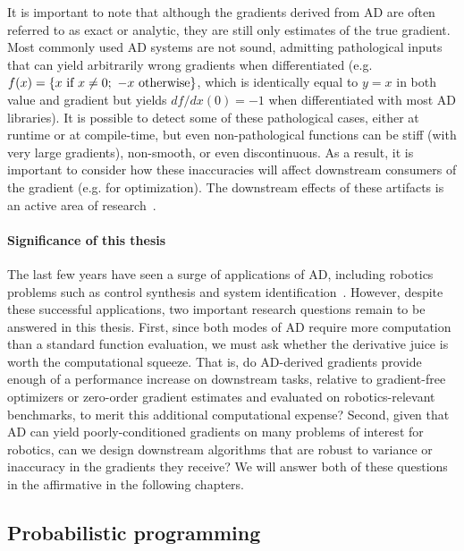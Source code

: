 It is important to note that although the gradients derived from AD are often referred to as exact or analytic, they are still only estimates of the true gradient. Most commonly used AD systems are not sound, admitting pathological inputs that can yield arbitrarily wrong gradients when differentiated (e.g. $f(x) = \left\{x \text{ if } x \neq 0;\ -x \text{ otherwise}\right\}$, which is identically equal to $y = x$ in both value and gradient but yields $df/dx(0) = -1$ when differentiated with most AD libraries). It is possible to detect some of these pathological cases, either at runtime or at compile-time, but even non-pathological functions can be stiff (with very large gradients), non-smooth, or even discontinuous. As a result, it is important to consider how these inaccuracies will affect downstream consumers of the gradient (e.g. for optimization). The downstream effects of these artifacts is an active area of research~\cite{suh2021_bundled_gradients,suhDifferentiableSimulatorsGive2022,metzGradientsAreNot2022}.

\paragraph{Significance of this thesis} The last few years have seen a surge of applications of AD, including robotics problems such as control synthesis and system identification~\cite{xuAcceleratedPolicyLearning2022,agrawalDifferentiableConvexOptimization2019,amosOptNetDifferentiableOptimization2017,belubute_peres_lcp_physics,du2021underwater}. However, despite these successful applications, two important research questions remain to be answered in this thesis. First, since both modes of AD require more computation than a standard function evaluation, we must ask whether the derivative juice is worth the computational squeeze. That is, do AD-derived gradients provide enough of a performance increase on downstream tasks, relative to gradient-free optimizers or zero-order gradient estimates and evaluated on robotics-relevant benchmarks, to merit this additional computational expense? Second, given that AD can yield poorly-conditioned gradients on many problems of interest for robotics, can we design downstream algorithms that are robust to variance or inaccuracy in the gradients they receive? We will answer both of these questions in the affirmative in the following chapters.

\subsection{Probabilistic programming}

